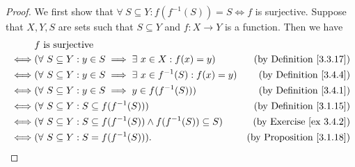 \begin{proof}
    We first show that \(\forall\ S \subseteq Y : f(f^{-1}(S)) = S \iff f\) is surjective.
    Suppose that \(X, Y, S\) are sets such that \(S \subseteq Y\) and \(f : X \to Y\) is a function.
    Then we have
    \begin{align*}
             & f \text{ is surjective}                                                                                                   \\
        \iff & (\forall\ S \subseteq Y : y \in S \implies \exists\ x \in X : f(x) = y)            & \text{(by Definition \ref{3.3.17})}  \\
        \iff & (\forall\ S \subseteq Y : y \in S \implies \exists\ x \in f^{-1}(S) : f(x) = y)    & \text{(by Definition \ref{3.4.4})}   \\
        \iff & (\forall\ S \subseteq Y : y \in S \implies y \in f(f^{-1}(S)))                     & \text{(by Definition \ref{3.4.1})}   \\
        \iff & (\forall\ S \subseteq Y : S \subseteq f(f^{-1}(S)))                                & \text{(by Definition \ref{3.1.15})}  \\
        \iff & (\forall\ S \subseteq Y : S \subseteq f(f^{-1}(S)) \land f(f^{-1}(S)) \subseteq S) & \text{(by Exercise \ref{ex 3.4.2})}  \\
        \iff & (\forall\ S \subseteq Y : S = f(f^{-1}(S))).                                       & \text{(by Proposition \ref{3.1.18})}
    \end{align*}


\end{proof}
